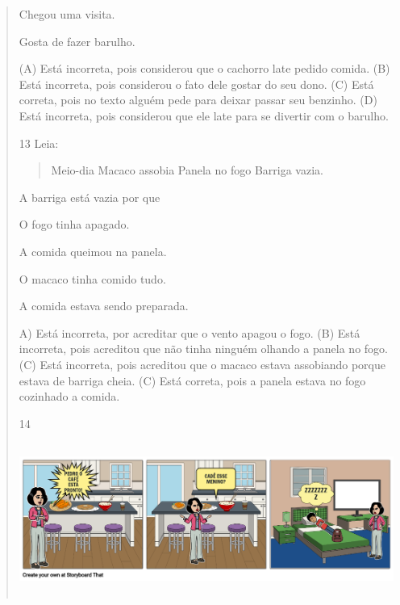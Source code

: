 \begin{verse}
\begin{escolha}
\item Chegou uma visita.

\item Gosta de fazer barulho.
\end{escolha}


(A) Está incorreta, pois considerou que o cachorro late pedido comida.
(B) Está incorreta, pois considerou o fato dele gostar do seu dono.
(C) Está correta, pois no texto alguém pede para deixar passar seu benzinho.
(D) Está incorreta, pois considerou que ele late para se divertir com o barulho.

\num{13} Leia:

\begin{verse}
Meio-dia
Macaco assobia
Panela no fogo
Barriga vazia.
\end{verse}


A barriga está vazia por que

\begin{escolha}
\item O fogo tinha apagado.

\item A comida queimou na panela.

\item O macaco tinha comido tudo.

\item A comida estava sendo preparada.
\end{escolha}


A) Está incorreta, por acreditar que o vento apagou o fogo.
(B) Está incorreta, pois acreditou que não tinha ninguém olhando a panela no fogo.
(C) Está incorreta, pois acreditou que o macaco estava assobiando porque estava de barriga cheia.
(C) Está correta, pois a panela estava no fogo cozinhado a comida.

\num{14}

\includegraphics[width=5.90556in,height=1.95556in]{media/image146.png}


\end{verse}

